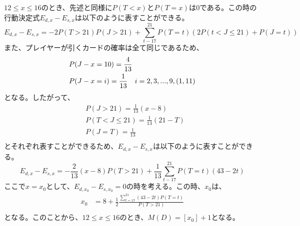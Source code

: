         \subsubsection{}
            $12\leq x \leq 16$のとき、先述と同様に$P(T < x)$と$P(T = x)$は0である。この時の行動決定式$E_{d,x} - E_{s,x}$は以下のように表すことができる。
            \begin{displaymath}
                E_{d,x} - E_{s,x} = -2P(T>21)P(J>21) + \sum_{t-17}^{21}P(T=t)(2P(t<J\leq21) + P(J=t))
            \end{displaymath}
            また、プレイヤーが引くカードの確率は全て同じであるため、
            \begin{eqnarray}
                \begin{split}
                    &P(J-x=10)=\frac{4}{13} \notag\\
                    &P(J-x=i)=\frac{1}{13} \quad i=2,3,...,9,(1,11) \notag
                \end{split}
            \end{eqnarray}
            となる。したがって、
            \begin{displaymath}
                \begin{split}
                    &P(J>21)=\frac{1}{13}(x-8)\\
                    &P(T<J\leq21)=\frac{1}{13}(21-T)\\
                    &P(J=T)=\frac{1}{13}\\
                \end{split}
            \end{displaymath}
                とそれぞれ表すことができるため、$E_{d,x} - E_{s,x}$は以下のように表すことができる。
            \begin{displaymath}
                E_{d,x} - E_{s,x} = -\frac{2}{13}(x-8)P(T>21)+\frac{1}{13}\sum_{t-17}^{21}P(T=t)(43-2t)
            \end{displaymath}
            ここで$x=x_0$として、$E_{d,x_0} - E_{s,x_0}=0$の時を考える。この時、$x_0$は、
            \begin{displaymath}
                \begin{split}
                    x_0&=8+\frac{1}{2}\frac{\sum_{t=17}^{21}(43-2t)P(T=t)}{P(T>21)}\\
                \end{split}
            \end{displaymath}
            となる。このことから、$12\leq x\leq 16$のとき、$M(D)=[x_0]+1$となる。
